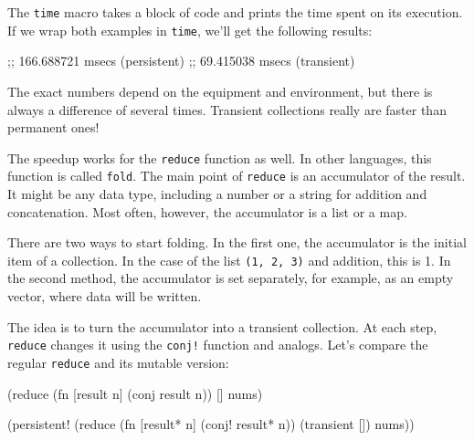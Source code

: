 The \verb|time| macro takes a block of code and prints the time spent on its execution.
If we wrap both examples in \verb|time|, we'll get the following results:

\begin{english}
  \begin{text}
;; 166.688721 msecs (persistent)
;;  69.415038 msecs (transient)
  \end{text}
\end{english}

The exact numbers depend on the equipment and environment, but there is always a difference of several times. Transient collections really are faster than permanent ones!


The speedup works for the \verb|reduce| function as well. In other languages, this function is called \verb|fold|. The main point of \verb|reduce| is an accumulator of the result.
It might be any data type, including a number or a string for addition and concatenation. Most often, however, the accumulator is a list or a map.

There are two ways to start folding.
In the first one, the accumulator is the initial item of a collection. In the case of the list \verb|(1, 2, 3)| and addition, this is 1. In the second method, the accumulator is set separately, for example, as an empty vector, where data will be written.

The idea is to turn the accumulator into a transient collection.
At each step, \verb|reduce| changes it using the \verb|conj!| function and analogs.
Let's compare the regular \verb|reduce| and its mutable version:

\ifx\DEVICETYPE\MOBILE

\begin{english}
  \begin{clojure}
(reduce
 (fn [result n]
   (conj result n))
 []
 nums)
  \end{clojure}

\splitter

  \begin{clojure}
(persistent!
 (reduce
  (fn [result* n]
    (conj! result* n))
  (transient [])
  nums))
  \end{clojure}
\end{english}

\else

